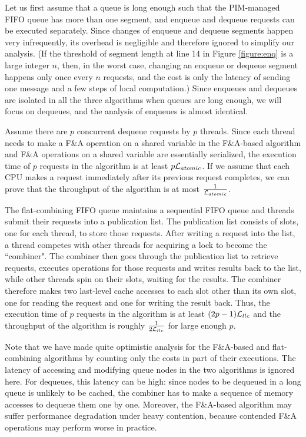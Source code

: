 Let us first assume that a queue is long enough such that the PIM-managed FIFO queue 
has more than one segment, and enqueue and dequeue requests can be executed separately. 
Since changes of enqueue and dequeue segments happen very infrequently, 
its overhead is negligible and therefore ignored to simplify our analysis.
(If the threshold of segment length at line 14 in Figure \ref{figure:enq} is a large integer $n$, 
then, in the worst case, changing an enqueue or dequeue segment happens only once every $n$ requests, 
and the cost is only the latency of sending one message and a few steps of local computation.)
Since enqueues and dequeues are isolated in all the three algorithms when queues are long enough, 
we will focus on dequeues, and the analysis of enqueues is almost identical. 

Assume there are $p$ concurrent dequeue requests by $p$ threads. 
Since each thread needs to make a F\&A operation on a shared variable in the F\&A-based algorithm 
and F\&A operations on a shared variable are essentially serialized, 
the execution time of $p$ requests in the algorithm is at least $p\mathcal{L}_{atomic}$. 
If we assume that each CPU makes a request immediately after its previous request completes, 
we can prove that the throughput of the algorithm is at most ${1 \over \mathcal{L}_{atomic}}$. 

The flat-combining FIFO queue maintains a sequential FIFO queue and 
threads submit their requests into a publication list. 
The publication list consists of slots, one for each thread, to store those requests.
After writing a request into the list, a thread competes with other threads for acquiring a lock 
to become the ``combiner". 
The combiner then goes through the publication list to retrieve requests, executes operations for 
those requests and writes results back to the list, while other threads spin on their slots, 
waiting for the results. 
The combiner therefore makes two last-level cache accesses to each slot other than its own slot, 
one for reading the request and one for writing the result back. 
Thus, the execution time of $p$ requests in the algorithm is at least $(2p-1)\mathcal{L}_{llc}$ and 
the throughput of the algorithm is roughly ${1 \over 2\mathcal{L}_{llc}}$ for large enough $p$.

Note that we have made quite optimistic analysis for the F\&A-based and flat-combining algorithms 
by counting only the costs in part of their executions. 
The latency of accessing and modifying queue nodes in the two algorithms is ignored here. 
For dequeues, this latency can be high: since nodes to be dequeued in a long queue is unlikely 
to be cached, the combiner has to make a sequence of memory accesses to dequeue them one by one.  
Moreover, the F\&A-based algorithm may suffer performance degradation under heavy contention, 
because contended F\&A operations may perform worse in practice.

